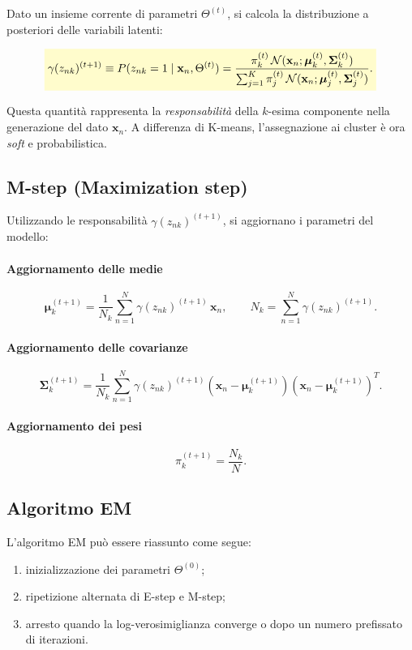 \documentclass[a4paper,12pt]{report}
\newcommand{\highlight}[1]{%
\colorbox{yellow!20}{$\displaystyle #1$}%
}
\begin{document}
Dato un insieme corrente di parametri $\Theta^{(t)}$, si calcola la distribuzione a posteriori delle variabili latenti:

\[
\highlight{
\gamma(z_{nk})^{(t+1)} \equiv
P(z_{nk} = 1 \mid \mathbf{x}_n, \Theta^{(t)})
=
\frac{\pi_k^{(t)} \, \mathcal{N}(\mathbf{x}_n; \boldsymbol{\mu}_k^{(t)}, \boldsymbol{\Sigma}_k^{(t)})}
{\sum_{j=1}^{K} \pi_j^{(t)} \, \mathcal{N}(\mathbf{x}_n; \boldsymbol{\mu}_j^{(t)}, \boldsymbol{\Sigma}_j^{(t)})}.}
\]

Questa quantità rappresenta la \emph{responsabilità} della $k$-esima componente nella generazione del dato $\mathbf{x}_n$.
A differenza di K-means, l’assegnazione ai cluster è ora \emph{soft} e probabilistica.

\subsection{M-step (Maximization step)}

Utilizzando le responsabilità $\gamma(z_{nk})^{(t+1)}$, si aggiornano i parametri del modello:

\paragraph{Aggiornamento delle medie}
\[
\boldsymbol{\mu}_k^{(t+1)} =
\frac{1}{N_k}
\sum_{n=1}^{N}
\gamma(z_{nk})^{(t+1)} \, \mathbf{x}_n,
\qquad
N_k = \sum_{n=1}^{N} \gamma(z_{nk})^{(t+1)}.
\]

\paragraph{Aggiornamento delle covarianze}
\[
\boldsymbol{\Sigma}_k^{(t+1)} =
\frac{1}{N_k}
\sum_{n=1}^{N}
\gamma(z_{nk})^{(t+1)}
(\mathbf{x}_n - \boldsymbol{\mu}_k^{(t+1)})
(\mathbf{x}_n - \boldsymbol{\mu}_k^{(t+1)})^T.
\]

\paragraph{Aggiornamento dei pesi}
\[
\pi_k^{(t+1)} = \frac{N_k}{N}.
\]

\subsection{Algoritmo EM}

L’algoritmo EM può essere riassunto come segue:
\begin{enumerate}
    \item inizializzazione dei parametri $\Theta^{(0)}$;
    \item ripetizione alternata di E-step e M-step;
    \item arresto quando la log-verosimiglianza converge o dopo un numero prefissato di iterazioni.
\end{enumerate}
\end{document}
